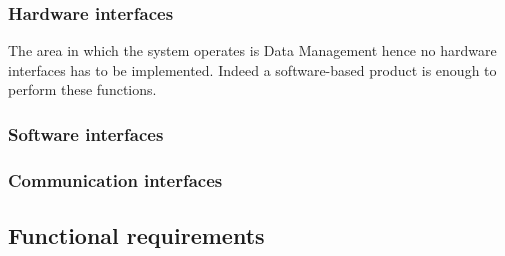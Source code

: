 \clearpage

    \subsubsection{Hardware interfaces}

The area in which the system operates is Data Management hence no hardware interfaces has to be implemented. Indeed a software-based product is enough to perform these functions.

    \subsubsection{Software interfaces}

    \subsubsection{Communication interfaces}

  \subsection{Functional requirements}

